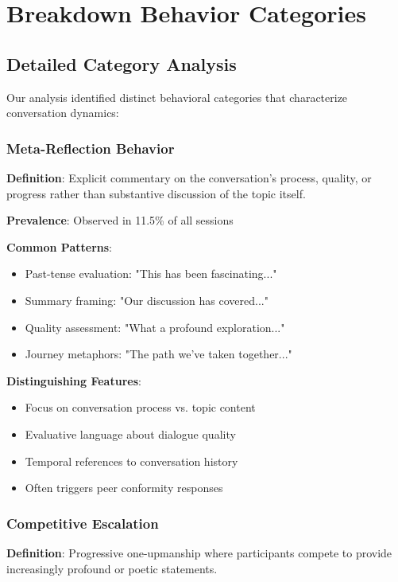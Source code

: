 \documentclass[11pt,letterpaper]{article}
\newcommand{\exponedataMetaReflectionTriggers}{11.5\%}
\begin{document}
\section{Breakdown Behavior Categories}
\label{app:breakdown}

\subsection{Detailed Category Analysis}

Our analysis identified distinct behavioral categories that characterize conversation dynamics:

\subsubsection{Meta-Reflection Behavior}

\textbf{Definition}: Explicit commentary on the conversation's process, quality, or progress rather than substantive discussion of the topic itself.

\textbf{Prevalence}: Observed in \exponedataMetaReflectionTriggers{} of all sessions

\textbf{Common Patterns}:
\begin{itemize}
    \item Past-tense evaluation: "This has been fascinating..."
    \item Summary framing: "Our discussion has covered..."
    \item Quality assessment: "What a profound exploration..."
    \item Journey metaphors: "The path we've taken together..."
\end{itemize}

\textbf{Distinguishing Features}:
\begin{itemize}
    \item Focus on conversation process vs. topic content
    \item Evaluative language about dialogue quality
    \item Temporal references to conversation history
    \item Often triggers peer conformity responses
\end{itemize}

\subsubsection{Competitive Escalation}

\textbf{Definition}: Progressive one-upmanship where participants compete to provide increasingly profound or poetic statements.
\end{document}

